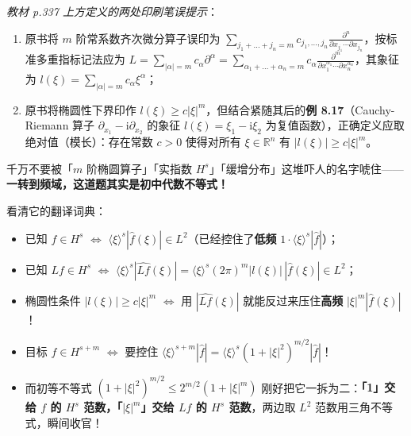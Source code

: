 \documentclass[11pt,a4paper]{article}
\providecommand{\tightlist}{\setlength{\itemsep}{1.8pt}\setlength{\parskip}{0pt}}
\newcommand{\SubPillAmber}[1]{%
  \Needspace{4.5\baselineskip}\vspace{5.5pt}\noindent
  \tcbox[on line, colback=AmberSoft, colframe=AmberMain!45!BorderColor, boxrule=0.45pt,
    arc=3.5pt, left=6pt, right=6pt, top=2pt, bottom=2pt]{\small\bfseries\color{AmberMain}#1}%
  \par\nopagebreak[4]\vspace{3pt}%
}
\renewenvironment{quote}{%
  \begin{tcolorbox}[
    enhanced,
    breakable,
    colback=AccentSoft!48!white,
    colframe=AccentMain,
    boxrule=0pt,
    leftrule=2.8pt,
    arc=2.5pt,
    left=9pt, right=8pt, top=6pt, bottom=6pt,
    before skip=5.5pt, after skip=5.5pt
  ]\small
}{%
  \end{tcolorbox}%
}
\begin{document}
\begin{quote}
\emph{教材 p.337 上方定义的两处印刷笔误提示}：

\begin{enumerate}
\def\labelenumi{\arabic{enumi}.}
\tightlist
\item
  原书将 \(m\) 阶常系数齐次微分算子误印为 \(\sum_{j_1+\dots+j_n=m} c_{j_1,\dots,j_n}\frac{\partial^n}{\partial x_{j_1}\cdots\partial x_{j_n}}\)，按标准多重指标记法应为 \(L = \sum_{|\alpha|=m} c_\alpha \partial^\alpha = \sum_{\alpha_1+\dots+\alpha_n=m} c_\alpha \frac{\partial^m}{\partial x_1^{\alpha_1}\cdots\partial x_n^{\alpha_n}}\)，其象征为 \(l(\xi) = \sum_{|\alpha|=m} c_\alpha \xi^\alpha\)；
\item
  原书将椭圆性下界印作 \(l(\xi) \ge c|\xi|^m\)，但结合紧随其后的\textbf{例 8.17}（Cauchy-Riemann 算子 \(\partial_{x_1} - \mathrm{i}\partial_{x_2}\) 的象征 \(l(\xi) = \xi_1 - \mathrm{i}\xi_2\) 为复值函数），正确定义应取绝对值（模长）：存在常数 \(c > 0\) 使得对所有 \(\xi \in \mathbb{R}^n\) 有 \(|l(\xi)| \ge c|\xi|^m\)。
\end{enumerate}
\end{quote}

\SubPillAmber{【零基础破题思路】}

千万不要被「\(m\) 阶椭圆算子」「实指数 \(H^s\)」「缓增分布」这堆吓人的名字唬住——\textbf{一转到频域，这道题其实是初中代数不等式！}

看清它的翻译词典：

\begin{itemize}
\tightlist
\item
  已知 \(f \in H^s\) \(\iff\) \(\langle\xi\rangle^s |\hat{f}(\xi)| \in L^2\)（已经控住了\textbf{低频} \(1 \cdot \langle\xi\rangle^s |\hat{f}|\)）；
\item
  已知 \(Lf \in H^s\) \(\iff\) \(\langle\xi\rangle^s |\widehat{Lf}(\xi)| = \langle\xi\rangle^s (2\pi)^m |l(\xi)|\,|\hat{f}(\xi)| \in L^2\)；
\item
  椭圆性条件 \(|l(\xi)| \ge c|\xi|^m\) \(\iff\) 用 \(|\widehat{Lf}(\xi)|\) 就能反过来压住\textbf{高频} \(|\xi|^m|\hat{f}(\xi)|\)！
\item
  目标 \(f \in H^{s+m}\) \(\iff\) 要控住 \(\langle\xi\rangle^{s+m}|\hat{f}| = \langle\xi\rangle^s (1 + |\xi|^2)^{m/2} |\hat{f}|\)！
\item
  而初等不等式 \((1 + |\xi|^2)^{m/2} \le 2^{m/2}(1 + |\xi|^m)\) 刚好把它一拆为二：\textbf{「1」交给 \(f\) 的 \(H^s\) 范数，「\(|\xi|^m\)」交给 \(Lf\) 的 \(H^s\) 范数}，两边取 \(L^2\) 范数用三角不等式，瞬间收官！
\end{itemize}
\end{document}
